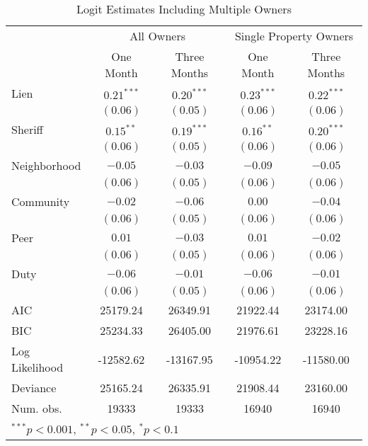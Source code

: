 \documentclass[12pt]{article}
\begin{document}
\begin{appendix}
\begin{table}[htbp]
\caption{Logit Estimates Including Multiple Owners}\label{sh_logit_rob}
\begin{center}
\begin{tabular}{l c c c c }
\hline
 & \multicolumn{2}{c}{All Owners} & \multicolumn{2}{c}{Single Property Owners} \\
 & One Month & Three Months & One Month & Three Months \\
\hline
Lien           & $0.21^{***}$ & $0.20^{***}$ & $0.23^{***}$ & $0.22^{***}$ \\
               & $(0.06)$     & $(0.05)$     & $(0.06)$     & $(0.06)$     \\
Sheriff        & $0.15^{**}$  & $0.19^{***}$ & $0.16^{**}$  & $0.20^{***}$ \\
               & $(0.06)$     & $(0.05)$     & $(0.06)$     & $(0.06)$     \\
Neighborhood   & $-0.05$      & $-0.03$      & $-0.09$      & $-0.05$      \\
               & $(0.06)$     & $(0.05)$     & $(0.06)$     & $(0.06)$     \\
Community      & $-0.02$      & $-0.06$      & $0.00$       & $-0.04$      \\
               & $(0.06)$     & $(0.05)$     & $(0.06)$     & $(0.06)$     \\
Peer           & $0.01$       & $-0.03$      & $0.01$       & $-0.02$      \\
               & $(0.06)$     & $(0.05)$     & $(0.06)$     & $(0.06)$     \\
Duty           & $-0.06$      & $-0.01$      & $-0.06$      & $-0.01$      \\
               & $(0.06)$     & $(0.05)$     & $(0.06)$     & $(0.06)$     \\
\hline
AIC            & 25179.24     & 26349.91     & 21922.44     & 23174.00     \\
BIC            & 25234.33     & 26405.00     & 21976.61     & 23228.16     \\
Log Likelihood & -12582.62    & -13167.95    & -10954.22    & -11580.00    \\
Deviance       & 25165.24     & 26335.91     & 21908.44     & 23160.00     \\
Num. obs.      & 19333        & 19333        & 16940        & 16940        \\
\hline
\multicolumn{5}{l}{\scriptsize{$^{***}p<0.001$, $^{**}p<0.05$, $^*p<0.1$}}
\end{tabular}
\end{center}
\end{table}


\end{appendix}
\end{document}
